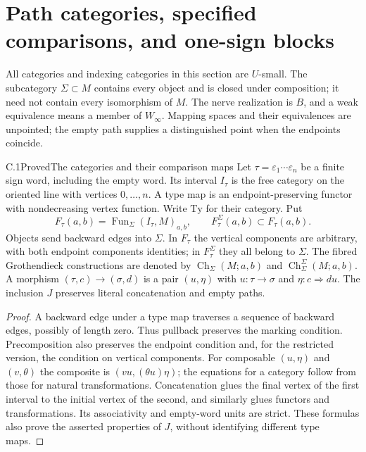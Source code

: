 \section{Path categories, specified comparisons, and one-sign blocks}
\label{sec:paths}

All categories and indexing categories in this section are $U$-small.
The subcategory $\Sigma\subset M$ contains every object and is closed
under composition; it need not contain every isomorphism of $M$.
The nerve realization is $B$, and a weak equivalence means a member of
$W_\infty$. Mapping spaces and their equivalences are unpointed; the
empty path supplies a distinguished point when the endpoints coincide.

\begin{claim}{C.1}{Proved}{The categories and their comparison maps}
Let $\tau=\varepsilon_1\cdots\varepsilon_n$ be a finite sign word,
including the empty word. Its interval $I_\tau$ is the free category
on the oriented line with vertices $0,\ldots,n$. A type map is an
endpoint-preserving functor with nondecreasing vertex function.
Write $\mathrm{Ty}$ for their category. Put
\[
 F_\tau(a,b)=\operatorname{Fun}_\Sigma(I_\tau,M)_{a,b},
 \qquad F_\tau^{\Sigma}(a,b)\subset F_\tau(a,b).
\]
Objects send backward edges into $\Sigma$. In $F_\tau$ the vertical
components are arbitrary, with both endpoint components identities;
in $F_\tau^\Sigma$ they all belong to $\Sigma$.
The fibred Grothendieck constructions are denoted by
$\operatorname{Ch}_\Sigma(M;a,b)$ and
$\operatorname{Ch}_\Sigma^\Sigma(M;a,b)$. A morphism $(\tau,c)\to
(\sigma,d)$ is a pair $(u,\eta)$ with
$u:\tau\to\sigma$ and $\eta:c\Rightarrow d u$.
The inclusion $J$ preserves literal concatenation and empty paths.
\end{claim}
\begin{proof}
A backward edge under a type map traverses a sequence of backward edges,
possibly of length zero. Thus pullback preserves the marking condition.
Precomposition also preserves the endpoint condition and, for the
restricted version, the condition on vertical components. For composable
$(u,\eta)$ and $(v,\theta)$ the composite is
$(vu,(\theta u)\eta)$; the equations for a category follow from those
for natural transformations. Concatenation glues the final vertex of
the first interval to the initial vertex of the second, and similarly
glues functors and transformations. Its associativity and empty-word
units are strict. These formulas also prove the asserted properties of
$J$, without identifying different type maps.
\end{proof}

